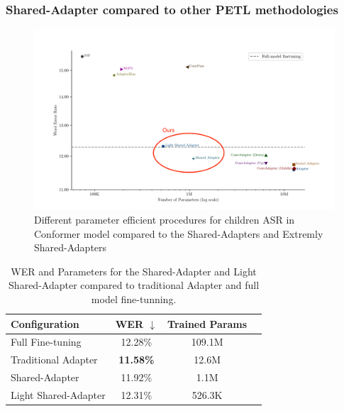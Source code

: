 \subsubsection{Shared-Adapter compared to other PETL methodologies}
\begin{figure}[t]
    \begin{center}
        \includegraphics[width=\textwidth]{imgs/Adapters_compare.png}
        \caption{Different parameter efficient procedures for children ASR in Conformer model compared to the Shared-Adapters and Extremly Shared-Adapters}
        \label{fig:adapter_compared}
    \end{center}
\end{figure}

\begin{table}[ht]
    \centering
    \begin{tabular}{l c c c}
        \hline
        \textbf{Configuration} & \textbf{WER $\downarrow$} & \textbf{Trained Params} \\
        \hline
        Full Fine-tuning & 12.28\% & 109.1M \\ \hline
        Traditional Adapter & \textbf{11.58\%} & 12.6M \\
        Shared-Adapter & 11.92\% & 1.1M \\
        Light Shared-Adapter & 12.31\% & 526.3K \\ \hline
    \end{tabular}
    \caption{WER and Parameters for the Shared-Adapter and Light Shared-Adapter compared to traditional Adapter and full model fine-tunning.}
    \label{tab:shared_adapter_results1}
\end{table}


